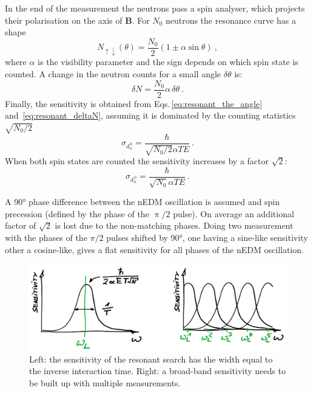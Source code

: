 In the end of the measurement the neutrons pass a spin analyser, which projects their polarisation on the axis of $\mathbf{B}$. For $N_0$ neutrons the resonance curve has a shape
\begin{equation}
  N_{\uparrow \downarrow}(\theta) = \frac{N_0}{2} \left( 1 \pm \alpha \sin \theta  \right)  \ ,
\end{equation}
where $\alpha$ is the visibility parameter and the sign depends on which spin state is counted. A change in the neutron counts for a small angle $\delta \theta$ is:
\begin{equation}
  \delta N = \frac{N_0}{2} \alpha \, \delta \theta \ .
  \label{eq:resonant_deltaN}
\end{equation}
Finally, the sensitivity is obtained from Eqs.\,\ref{eq:resonant_the_angle} and~\ref{eq:resonant_deltaN}, assuming it is dominated by the counting statistics $\sqrt{N_0/2}$
\begin{equation}
  \sigma_{d_n^{\,0}} = \frac{\hbar}{\sqrt{N_0/2} \alpha T E} \ .
\end{equation}
When both spin states are counted the sensitivity increases by a factor $\sqrt{2}$:
\begin{equation}
  \sigma_{d_n^{\,0}} = \frac{\hbar}{\sqrt{N_0} \alpha T E} \ .
\end{equation}

A \ang{90} phase difference between the nEDM oscillation is assumed and spin precession (defined by the phase of the $\uppi/2$ pulse). On average an additional factor of $\sqrt{2}$ is lost due to the non-matching phases.
Doing two measurement with the phases of the $\pi/2$ pulses shifted by \ang{90}, one having a sine-like sensitivity other a cosine-like, gives a flat sensitivity for all phases of the nEDM oscillation.

\begin{figure}
  \centering
  \includegraphics[width=\linewidth]{gfx/axions/resonant_sensitivity.png}
  \caption{Left: the sensitivity of the resonant search has the width equal to the inverse interaction time. Right: a broad-band sensitivity needs to be built up with multiple measurements.}\label{fig:axions_resonant_sensitivity}
\end{figure}

